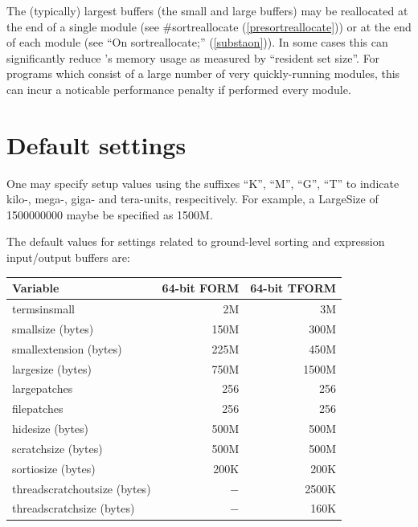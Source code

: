 The (typically) largest buffers (the small and large buffers) may be reallocated
at the end of a single module (see \#sortreallocate (\ref{presortreallocate})) or
at the end of each module (see ``On sortreallocate;'' (\ref{substaon})). In some
cases this can significantly reduce \FORM's memory usage as measured by
``resident set size''. For programs which consist of a large number of very
quickly-running modules, this can incur a noticable performance penalty if performed
every module.

\section{Default settings}

One may specify setup values using the suffixes ``K'', ``M'', ``G'', ``T'' to
indicate kilo-, mega-, giga- and tera-units, respecitively. For example, a
LargeSize of 1500000000 maybe be specified as 1500M.

The default values for settings related to ground-level sorting and expression
input/output buffers are:
\begin{center}
\begin{tabular}{lrr}
Variable         &      64-bit FORM  & 64-bit TFORM   \\ \hline
termsinsmall &          2M          & 3M           \\
smallsize (bytes) &     150M        & 300M         \\
smallextension (bytes)& 225M        & 450M         \\ \hline
largesize (bytes) &     750M        & 1500M        \\
largepatches &          256         & 256          \\
filepatches &           256         & 256          \\ \hline
hidesize (bytes) &      500M        & 500M         \\
scratchsize (bytes) &   500M        & 500M         \\
sortiosize (bytes) &    200K        & 200K         \\ \hline
threadscratchoutsize (bytes) & $-$  & 2500K        \\
threadscratchsize (bytes) & $-$     & 160K
\end{tabular}
\end{center}

